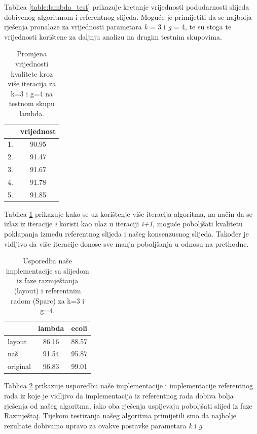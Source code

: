 \documentclass[times, utf8, seminar, numeric]{fer}
\begin{document}
Tablica \ref{table:lambda_test} prikazuje kretanje vrijednosti podudarnosti slijeda dobivenog algoritmom i referentnog slijeda. Moguće je primijetiti da se najbolja rješenja pronalaze za vrijednosti parametara \emph{k} = 3 i \emph{g} = 4, te su stoga te vrijednosti korištene za daljnju analizu na drugim testnim skupovima.

\begin{table}[htb]
	\centering
	\begin{tabular}{l|c}
		& \multicolumn{1}{l}{vrijednost}\\ 	\hline
		1. 					& 90.95 	\\ 	\hline
		2.  				& 91.47 	\\	\hline
		3.		   			& 91.67		\\ 	\hline
		4.		   			& 91.78		\\ 	\hline
		5.		   			& 91.85		\\ 	\hline
	\end{tabular}
	\caption{Promjena vrijednosti kvalitete kroz više iteracija za k=3 i g=4 na testnom skupu lambda.}
	\label{table:iteracije}
\end{table}


Tablica \ref{table:iteracije} prikazuje kako se uz korištenje više iteracija algoritma, na način da se izlaz iz iteracije \emph{i} koristi kao ulaz u iteraciji \emph{i+1}, moguće poboljšati kvalitetu poklapanja između referentnog slijeda i našeg konsenzusnog slijeda. Također je vidljivo da više iteracije donose sve manja poboljšanja u odnosu na prethodne.

\begin{table}[htb]
	\centering
	\begin{tabular}{l|cc}
		& \multicolumn{1}{l}{lambda} & ecoli \\ 	\hline
		layout 					& 86.16 	& 88.57 \\ 	\hline
		naš  					& 91.54     & 95.87 \\	\hline
		original		   		& 96.83 	& 99.01 \\ 	\hline
	\end{tabular}
	\caption{Usporedba naše implementacije sa slijedom iz faze razmještanja (layout) i referentnim radom (Sparc) za k=3 i g=4.}
	\label{table:kvaliteta}
\end{table}

Tablica \ref{table:kvaliteta} prikazuje usporedbu naše implementacije i implementacije referentnog rada iz koje je vidljivo da implementacija iz referentnog rada dobiva bolja rješenja od našeg algoritma, iako oba rješenja uspijevaju poboljšati slijed iz faze Razmještaj.
Tijekom testiranja našeg algoritma primijetili smo da najbolje rezultate dobivamo upravo za ovakve postavke parametara \emph{k} i \emph{g}. 
\end{document}
